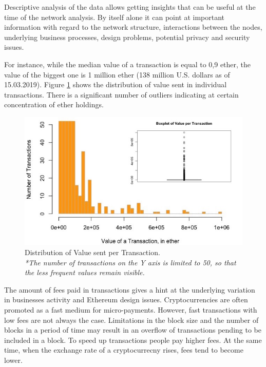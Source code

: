 Descriptive analysis of the data allows getting insights that can be useful at the time of the network analysis.
By itself alone it can point at important information with regard to the network structure, interactions between the nodes, underlying business processes, design problems, potential privacy and security issues.

For instance, while the median value of a transaction is equal to 0,9 ether, the value of the biggest one is 1 million ether (138 million U.S. dollars as of 15.03.2019). 
Figure \ref{fig:value_per_tx} shows the distribution of value sent in individual transactions. 
There is a significant number of outliers indicating at certain concentration of ether holdings.

\begin{figure}[ht]
  \centering
  \includegraphics[width=\linewidth]{figures/value_per_tx.jpeg}
  \caption{Distribution of Value sent per Transaction.\\ 
  \textit{*The number of transactions on the Y axis is limited to 50, so that the less frequent values remain visible.}}
  \label{fig:value_per_tx}
\end{figure}

The amount of fees paid in transactions gives a hint at the underlying variation in businesses activity and Ethereum design issues. 
Cryptocurrencies are often promoted as a fast medium for micro-payments. 
However, fast transactions with low fees are not always the case.
Limitations in the block size and the number of blocks in a period of time may result in an overflow of transactions pending to be included in a block.
To speed up transactions people pay higher fees.
At the same time, when the exchange rate of a cryptocurrecny rises, fees tend to become lower.

